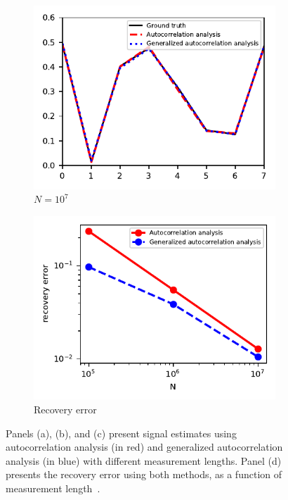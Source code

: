\documentclass{article}
\newcommand{\rev}[1]{{\color{magenta}{#1}}}
\begin{document}
\begin{figure}[!tb]
\begin{subfigure}[ht]{0.245\textwidth}
		\includegraphics[width=\columnwidth]{figures/recovery_3.pdf}
		\caption{$N = 10^7$}
	\end{subfigure}
	\hfill
	\begin{subfigure}[ht]{0.245\textwidth}
		\centering
		\includegraphics[width=\columnwidth]{figures/recovery_errs.pdf}
		\caption{Recovery error}
	\end{subfigure}
	\caption{Panels (a), (b), and (c) present signal estimates using autocorrelation analysis (in red) and generalized autocorrelation analysis (in blue) with different measurement lengths. Panel (d) presents the recovery error using both methods, as a function of measurement length~\rev{($N$)}.}
\label{fig:recoveries}
\end{figure}
\end{document}
